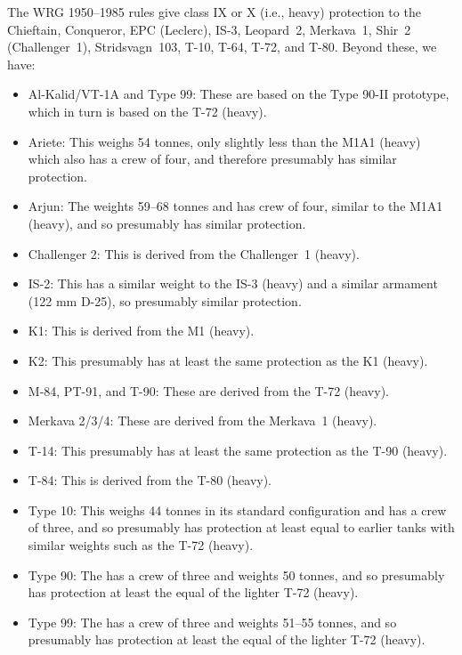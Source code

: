 {{        
        The WRG 1950--1985 rules give class IX or X (i.e., heavy) protection to the
        Chieftain,
        Conqueror,
        EPC (Leclerc),
        IS-3,
        Leopard~2,
        Merkava~1,
        Shir~2 (Challenger~1),
        Stridsvagn~103,
        T-10,
        T-64,
        T-72, and
        T-80.
        Beyond these, we have:
        \begin{itemize}
            \item Al-Kalid/VT-1A and Type 99: These are based on the Type 90-II prototype, which in turn is based on the T-72 (heavy).
            \item Ariete: This weighs 54 tonnes, only slightly less than the M1A1 (heavy) which also has a crew of four, and therefore presumably has similar protection.
            \item Arjun: The weights 59--68 tonnes and has crew of four, similar to the M1A1 (heavy), and so presumably has similar protection.
            \item Challenger 2: This is derived from the Challenger~1 (heavy).
            \item IS-2: This has a similar weight to the IS-3 (heavy) and a similar armament (122 mm D-25), so presumably similar protection.
            \item K1: This is derived from the M1 (heavy).
            \item K2: This presumably has at least the same protection as the K1 (heavy).
            \item M-84, PT-91, and T-90: These are derived from the T-72 (heavy).
            \item Merkava 2/3/4: These are derived from the Merkava~1 (heavy).
            \item T-14: This presumably has at least the same protection as the T-90 (heavy).
            \item T-84: This is derived from the T-80 (heavy).
            \item Type 10: This weighs 44 tonnes in its standard configuration and has a crew of three, and so presumably has protection at least equal to earlier tanks with similar weights such as the T-72 (heavy).
            \item Type 90: The has a crew of three and weights 50 tonnes, and so presumably has protection at least the equal of the lighter T-72 (heavy).
            \item Type 99: The has a crew of three and weights 51--55 tonnes, and so presumably has protection at least the equal of the lighter T-72 (heavy).

\end{itemize}}}
